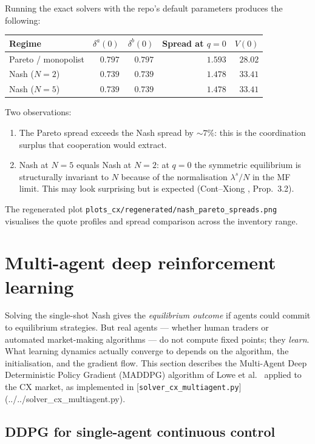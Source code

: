 Running the exact solvers with the repo's default parameters produces the following:
\begin{table}[h]
\centering
\begin{tabular}{@{}lrrrr@{}}
\toprule
Regime & $\delta^{a}(0)$ & $\delta^{b}(0)$ & Spread at $q = 0$ & $V(0)$ \\ \midrule
Pareto / monopolist & $0.797$ & $0.797$ & $1.593$ & $28.02$ \\
Nash ($N = 2$) & $0.739$ & $0.739$ & $\mathbf{1.478}$ & $33.41$ \\
Nash ($N = 5$) & $0.739$ & $0.739$ & $1.478$ & $33.41$ \\ \bottomrule
\end{tabular}
\end{table}

Two observations:
\begin{enumerate}[leftmargin=2em]
  \item The Pareto spread exceeds the Nash spread by $\sim 7\%$: this is the coordination surplus that cooperation would extract.
  \item Nash at $N = 5$ equals Nash at $N = 2$: at $q = 0$ the symmetric equilibrium is structurally invariant to $N$ because of the normalisation $\lambda^s / N$ in the MF limit. This may look surprising but is expected (Cont--Xiong \cite{cont2024}, Prop.~3.2).
\end{enumerate}

The regenerated plot \texttt{plots\_cx/regenerated/nash\_pareto\_spreads.png} visualises the quote profiles and spread comparison across the inventory range.

\section{Multi-agent deep reinforcement learning}
\label{sec:maddpg}

Solving the single-shot Nash gives the \emph{equilibrium outcome} if agents could commit to equilibrium strategies. But real agents --- whether human traders or automated market-making algorithms --- do not compute fixed points; they \emph{learn}. What learning dynamics actually converge to depends on the algorithm, the initialisation, and the gradient flow. This section describes the Multi-Agent Deep Deterministic Policy Gradient (MADDPG) algorithm of Lowe et al.\ \cite{lowe2017} applied to the CX market, as implemented in [\texttt{solver\_cx\_multiagent.py}](../../solver_cx_multiagent.py).

\subsection{DDPG for single-agent continuous control}

